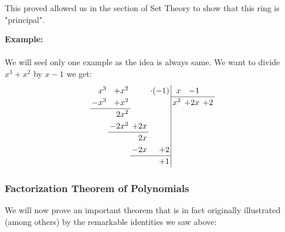 	\begin{tcolorbox}[title=Remark,colframe=black,arc=10pt]
	This proved allowed us in the section of Set Theory to show that this ring is "principal".
	\end{tcolorbox}
	\begin{tcolorbox}[colframe=black,colback=white,sharp corners]
	\textbf{{\Large {}}Example:}\\\\
	We will seel only one example as the idea is always same. We want to divide $x^3+x^2$ by $x-1$ we get:
	\begin{equation}
		\renewcommand{\arraystretch}{1.2}
		\renewcommand{\arraycolsep}{2pt}
		  \begin{array}{rrrr|rrr}
		 x^3&+x^2 &   &\cdot(-1)&x  &-1 &  \\
		\cline{5-7}
		-x^3&+x^2 &   &  &x^2&+2x&+2\\
		\cline{1-2}
		    &2x^2 &   &  &   &   &  \\
		    &-2x^2&+2x&  &   &   &  \\
		    \cline{2-3}
		    &     &2x &  &   &   &  \\
		    &     &-2x&+2&   &   &  \\
		              \cline{3-4}
		    &     &   &+1&   &   &  \\ 
		  \end{array}
	\end{equation}	
	\end{tcolorbox}
	
	
	\pagebreak
	\subsubsection{Factorization Theorem of Polynomials}
	We will now prove an important theorem that is in fact originally illustrated (among others) by the remarkable identities we saw above:
	
